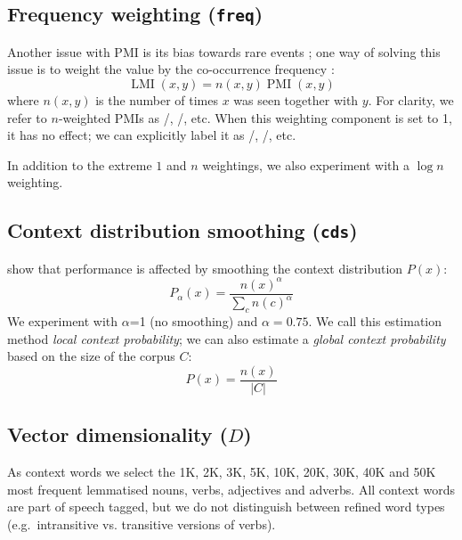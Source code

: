 \documentclass[11pt]{article}
\begin{document}
\subsection{Frequency weighting (\texttt{freq})}
\label{sec:frequency-weighting}

Another issue with PMI is its bias towards rare events \cite{TACL570}; one way of solving this issue is to weight the value by the co-occurrence frequency \cite{Evert05}:
%
\begin{equation}
  \label{eq:lmi}
  \operatorname{LMI}(x, y) = n(x, y)\operatorname{PMI}(x, y)
\end{equation}
%
where $n(x, y)$ is the number of times $x$ was seen together with $y$. For clarity, we refer to $n$-weighted PMIs as \NPMI/, \NSPMI/, etc. When this weighting component is set to 1, it has no effect; we can  explicitly label it as \PMI/, \SPMI/, etc.

In addition to the extreme $1$ and $n$ weightings, we also experiment with a $\log n$ weighting.

\subsection{Context distribution smoothing (\texttt{cds})}
\label{sec:cont-distr-smooth}

 show that performance is affected by smoothing the context distribution $P(x)$:
%
\begin{equation}
  \label{eq:cds}
  P_{\alpha}(x) = \frac{n(x)^{\alpha}}{\sum_{c}n(c)^{\alpha}}
\end{equation}
%
We experiment with $\alpha$=1 (no smoothing) and $\alpha = 0.75$. We call this estimation method \emph{local context probability}; we can also estimate a \emph{global context probability} based on the size of the corpus $C$:
%
\begin{equation}
  \label{eq:cds-nan}
  P(x) = \frac{n(x)}{|C|}
\end{equation}

\subsection{Vector dimensionality ($D$)}
\label{sec:vect-dimens}

As context words we select the 1K, 2K, 3K, 5K, 10K, 20K, 30K, 40K and 50K most frequent lemmatised nouns, verbs, adjectives and adverbs. All context words are part of speech tagged, but we do not distinguish between refined word types (e.g.~intransitive vs. transitive versions of verbs).
\end{document}
